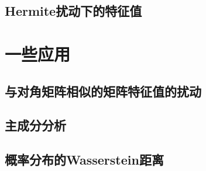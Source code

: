 \subsection{Hermite扰动下的特征值}
\label{sub:Hermite扰动下的特征值}

\section{一些应用}
\label{sec:一些应用}

\subsection{与对角矩阵相似的矩阵特征值的扰动}
\label{sub:与对角矩阵相似的矩阵特征值的扰动}

\subsection{主成分分析}
\label{sub:主成分分析}

\subsection{概率分布的Wasserstein距离}
\label{sub:概率分布的Wasserstein距离}


